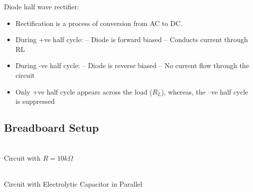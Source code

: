 \documentclass{article}
\begin{document}
\noindent
Diode half wave rectifier:
\begin{itemize}
\item Rectification is a process of conversion from AC to DC.
\item During +ve half cycle: – Diode is forward biased – Conducts current through RL
\item During -ve half cycle: – Diode is reverse biased – No current flow through the circuit
\item Only +ve half cycle appears across the load ($R_L$), whereas, the –ve half cycle is suppressed
\end{itemize}

\newpage

\subsection{Breadboard Setup}
\vspace{5px}
\begin{multicols}{2}
\begin{center}
 \\ \vspace{5px}
Circuit with $R=10k\Omega$\\

\columnbreak

 \\ \vspace{5px}
Circuit with Electrolytic Capacitor in Parallel
\end{center}
\end{multicols}
\end{document}

